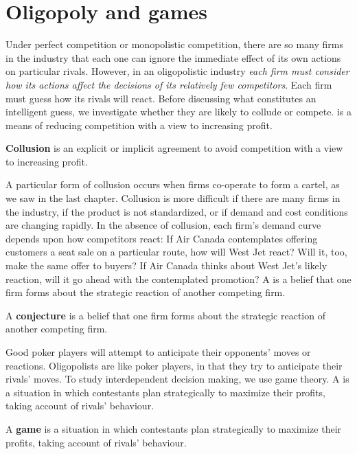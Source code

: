 \section{Oligopoly and games}\label{sec:ch11sec4}

Under perfect competition or monopolistic competition, there are so many
firms in the industry that each one can ignore the immediate effect of its
own actions on particular rivals. However, in an oligopolistic industry 
\textit{each firm must consider how its actions affect the decisions of its
	relatively few competitors}. Each firm must guess how its rivals will react.
Before discussing what constitutes an intelligent guess, we investigate
whether they are likely to collude or compete.  is a
means of reducing competition with a view to increasing profit.

\begin{DefBox}
	\textbf{Collusion} is an explicit or implicit agreement to avoid competition with a view to increasing profit.
\end{DefBox}

A particular form of collusion occurs when firms co-operate to form a
cartel, as we saw in the last chapter. Collusion is more difficult if there
are many firms in the industry, if the product is not standardized, or if
demand and cost conditions are changing rapidly. In the absence of
collusion, each firm's demand curve depends upon how competitors react: If
Air Canada contemplates offering customers a seat sale on a particular
route, how will West Jet react? Will it, too, make the same offer to buyers?
If Air Canada thinks about West Jet's likely reaction, will it go ahead with
the contemplated promotion? A  is a belief that one
firm forms about the strategic reaction of another competing firm.

\begin{DefBox}
	A \textbf{conjecture} is a belief that one firm forms about the strategic reaction of another competing firm.
\end{DefBox}

Good poker players will attempt to anticipate their opponents' moves or
reactions. Oligopolists are like poker players, in that they try to
anticipate their rivals' moves. To study interdependent decision making, we
use game theory. A  is a situation in which contestants
plan strategically to maximize their profits, taking account of rivals'
behaviour.

\begin{DefBox}
	A \textbf{game} is a situation in which contestants plan strategically to maximize their profits, taking account of rivals' behaviour.
\end{DefBox}

